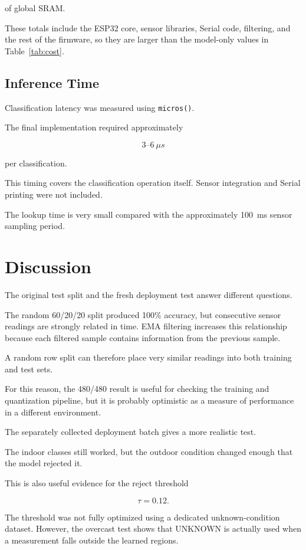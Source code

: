 \documentclass[10pt,a4paper,twocolumn]{article}
\begin{document}
of global SRAM.

These totals include the ESP32 core, sensor libraries, Serial code, filtering,
and the rest of the firmware, so they are larger than the model-only values in
Table~\ref{tab:cost}.


\subsection{Inference Time}

Classification latency was measured using \texttt{micros()}.

The final implementation required approximately

\[
3\text{--}6~\mu s
\]

per classification.

This timing covers the classification operation itself. Sensor integration and
Serial printing were not included.

The lookup time is very small compared with the approximately 100~ms sensor
sampling period.


\section{Discussion}

The original test split and the fresh deployment test answer different
questions.

The random 60/20/20 split produced 100\% accuracy, but consecutive sensor
readings are strongly related in time. EMA filtering increases this
relationship because each filtered sample contains information from the
previous sample.

A random row split can therefore place very similar readings into both
training and test sets.

For this reason, the 480/480 result is useful for checking the training and
quantization pipeline, but it is probably optimistic as a measure of
performance in a different environment.

The separately collected deployment batch gives a more realistic test.

The indoor classes still worked, but the outdoor condition changed enough that
the model rejected it.

This is also useful evidence for the reject threshold

\[
\tau=0.12.
\]

The threshold was not fully optimized using a dedicated unknown-condition
dataset. However, the overcast test shows that UNKNOWN is actually used when a
measurement falls outside the learned regions.
\end{document}

